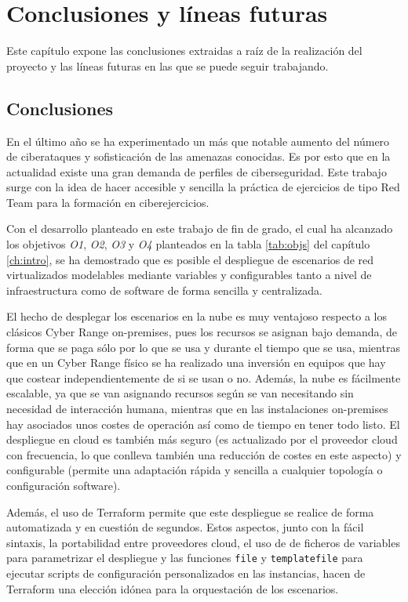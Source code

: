 \chapter{Conclusiones y líneas futuras} \label{ch:con}
  Este capítulo expone las conclusiones extraidas a raíz de la realización del proyecto y las líneas futuras en las que se puede seguir trabajando.

\section{Conclusiones} \label{sec:concs}
  En el último año se ha experimentado un más que notable aumento del número de ciberataques y sofisticación de las amenazas conocidas. Es por esto que en la actualidad existe una gran demanda de perfiles de ciberseguridad. Este trabajo surge con la idea de hacer accesible y sencilla la práctica de ejercicios de tipo Red Team para la formación en ciberejercicios. 

  Con el desarrollo planteado en este trabajo de fin de grado, el cual ha alcanzado los objetivos \textit{O1}, \textit{O2}, \textit{O3} y \textit{O4} planteados en la tabla \ref{tab:objs} del capítulo \ref{ch:intro}, se ha demostrado que es posible el despliegue de escenarios de red virtualizados modelables mediante variables y configurables tanto a nivel de infraestructura como de software de forma sencilla y centralizada.

  El hecho de desplegar los escenarios en la nube es muy ventajoso respecto a los clásicos Cyber Range on-premises, pues los recursos se asignan bajo demanda, de forma que se paga sólo por lo que se usa y durante el tiempo que se usa, mientras que en un Cyber Range físico se ha realizado una inversión en equipos que hay que costear independientemente de si se usan o no. Además, la nube es fácilmente escalable, ya que se van asignando recursos según se van necesitando sin necesidad de interacción humana, mientras que en las instalaciones on-premises hay asociados unos costes de operación así como de tiempo en tener todo listo. El despliegue en cloud es también más seguro (es actualizado por el proveedor cloud con frecuencia, lo que conlleva también una reducción de costes en este aspecto) y configurable (permite una adaptación rápida y sencilla a cualquier topología o configuración software).

  Además, el uso de Terraform permite que este despliegue se realice de forma automatizada y en cuestión de segundos. Estos aspectos, junto con la fácil sintaxis, la portabilidad entre proveedores cloud, el uso de de ficheros de variables para parametrizar el despliegue y las funciones \texttt{file} y \texttt{templatefile} para ejecutar scripts de configuración personalizados en las instancias, hacen de Terraform una elección idónea para la orquestación de los escenarios.

